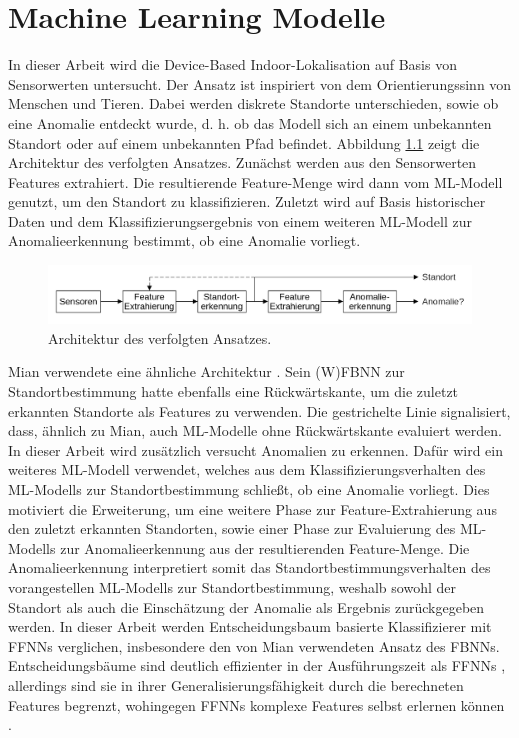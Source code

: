 \chapter{Machine Learning Modelle}
In dieser Arbeit wird die Device-Based Indoor-Lokalisation auf Basis von Sensorwerten untersucht.
Der Ansatz ist inspiriert von dem Orientierungssinn von Menschen und Tieren.
Dabei werden diskrete Standorte unterschieden, sowie ob eine Anomalie entdeckt wurde,
d. h. ob das Modell sich an einem unbekannten Standort oder auf einem unbekannten Pfad befindet.
\newline
\newline
Abbildung \ref{fig:model_idea} zeigt die Architektur des verfolgten Ansatzes.
Zunächst werden aus den Sensorwerten Features extrahiert.
Die resultierende Feature-Menge wird dann vom ML-Modell genutzt, um den Standort zu klassifizieren.
Zuletzt wird auf Basis historischer Daten und dem Klassifizierungsergebnis von einem weiteren ML-Modell zur Anomalieerkennung bestimmt, ob eine Anomalie vorliegt.
\begin{figure}[h!]
    \centering
    \includegraphics[width=\linewidth]{images/model_idea.png}
    \caption{Architektur des verfolgten Ansatzes.}
    \label{fig:model_idea}
\end{figure}
\newline
Mian verwendete eine ähnliche Architektur \cite{naveedThesis}.
Sein (W)FBNN zur Standortbestimmung hatte ebenfalls eine Rückwärtskante, um die zuletzt erkannten Standorte als Features zu verwenden.
Die gestrichelte Linie signalisiert, dass, ähnlich zu Mian, auch ML-Modelle ohne Rückwärtskante evaluiert werden.
In dieser Arbeit wird zusätzlich versucht Anomalien zu erkennen.
Dafür wird ein weiteres ML-Modell verwendet, welches aus dem Klassifizierungsverhalten des ML-Modells zur Standortbestimmung schließt, ob eine Anomalie vorliegt.
Dies motiviert die Erweiterung, um eine weitere Phase zur Feature-Extrahierung aus den zuletzt erkannten Standorten,
sowie einer Phase zur Evaluierung des ML-Modells zur Anomalieerkennung aus der resultierenden Feature-Menge.
\newpage
Die Anomalieerkennung interpretiert somit das Standortbestimmungsverhalten des vorangestellen ML-Modells zur Standortbestimmung,
weshalb sowohl der Standort als auch die Einschätzung der Anomalie als Ergebnis zurückgegeben werden.
\newline
\newline
In dieser Arbeit werden Entscheidungsbaum basierte Klassifizierer mit FFNNs verglichen, insbesondere den von Mian verwendeten Ansatz des FBNNs.
Entscheidungsbäume sind deutlich effizienter in der Ausführungszeit als FFNNs \cite{dymelThesis},
allerdings sind sie in ihrer Generalisierungsfähigkeit durch die berechneten Features begrenzt,
wohingegen FFNNs komplexe Features selbst erlernen können \cite{seide2011feature}.







